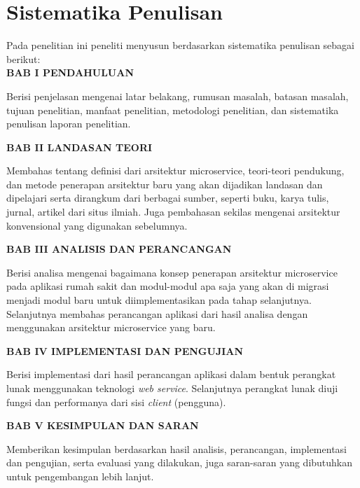 \section{Sistematika Penulisan}
Pada penelitian ini peneliti menyusun berdasarkan sistematika penulisan sebagai berikut: \\[0.5cm]
\noindent \textbf{BAB I \hspace{1cm} PENDAHULUAN}
\begin{addmargin}[2.35cm]{0em}
Berisi penjelasan mengenai latar belakang, rumusan masalah, batasan masalah, tujuan penelitian, manfaat penelitian, metodologi penelitian, dan sistematika penulisan laporan penelitian. 
\end{addmargin}
\noindent \textbf{BAB II \hspace{0.8cm} LANDASAN TEORI}
\begin{addmargin}[2.35cm]{0em}
Membahas tentang definisi dari arsitektur microservice, teori-teori pendukung, dan metode penerapan arsitektur baru yang akan dijadikan landasan dan dipelajari serta dirangkum dari berbagai sumber, seperti buku, karya tulis, jurnal, artikel dari situs ilmiah. Juga pembahasan sekilas mengenai arsitektur konvensional yang digunakan sebelumnya.
\end{addmargin}
\noindent \textbf{BAB III \hspace{0.7cm} ANALISIS DAN PERANCANGAN}
\begin{addmargin}[2.35cm]{0em}
Berisi analisa mengenai bagaimana konsep penerapan arsitektur microservice pada aplikasi rumah sakit dan modul-modul apa saja yang akan di migrasi menjadi modul baru untuk diimplementasikan pada tahap selanjutnya. Selanjutnya membahas perancangan aplikasi dari hasil analisa dengan menggunakan arsitektur microservice yang baru.
\end{addmargin}
\noindent \textbf{BAB IV \hspace{0.7cm} IMPLEMENTASI DAN PENGUJIAN}
\begin{addmargin}[2.35cm]{0em}
Berisi implementasi dari hasil perancangan aplikasi dalam bentuk perangkat lunak menggunakan teknologi \textit{web service}. Selanjutnya perangkat lunak diuji fungsi dan performanya dari sisi \textit{client} (pengguna).
\end{addmargin}
\noindent \textbf{BAB V \hspace{0.8cm} KESIMPULAN DAN SARAN}
\begin{addmargin}[2.35cm]{0em}
Memberikan kesimpulan berdasarkan hasil analisis, perancangan, implementasi dan pengujian, serta evaluasi yang dilakukan, juga saran-saran yang dibutuhkan untuk pengembangan lebih lanjut.
\end{addmargin}

\newpage